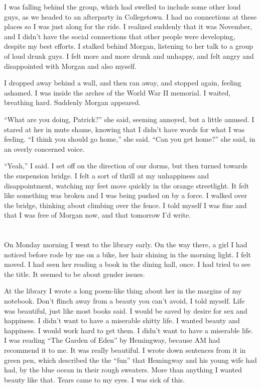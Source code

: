 I was falling behind the group, which had swelled to include some other loud
guys, as we headed to an afterparty in Collegetown.  I had no connections at
these places so I was just along for the ride.  I realized suddenly that it was
November, and I didn't have the social connections that other people were
developing, despite my best efforts.  I stalked behind Morgan, listening to her
talk to a group of loud drunk guys.  I felt more and more drunk and unhappy, and
felt angry and disappointed with Morgan and also myself.

I dropped away behind a wall, and then ran away, and stopped again, feeling
ashamed.   I was inside the arches of the World War II memorial.  I waited,
breathing hard.  Suddenly Morgan appeared.  

``What are you doing, Patrick?'' she said, seeming annoyed, but a little amused.
I stared at her in mute shame, knowing that I didn't have words for what I was
feeling.  ``I think you should go home,'' she said.  ``Can you get home?'' she
said, in an overly concerned voice.

``Yeah,'' I said.  I set off on the direction of our dorms, but then turned
towards the suspension bridge.  I felt a sort of thrill at my unhappiness and
disappointment, watching my feet move quickly in the orange streetlight.  It
felt like something was broken and I was being pushed on by a force.  I walked
over the bridge, thinking about climbing over the fence.  I told myself I was
fine and that I was free of Morgan now, and that tomorrow I'd write.

\section{}

On Monday morning I went to the library early.  On the way there, a girl I had
noticed before rode by me on a bike, her hair shining in the morning light.  I
felt moved.  I had seen her reading a book in the dining hall, once.  I had
tried to see the title.  It seemed to be about gender issues.

At the library I wrote a long poem-like thing about her in the margins of my
notebook.  Don't flinch away from a beauty you can't avoid, I told myself.  Life
was beautiful, just like most books said.  I would be saved by desire for sex and
happiness.  I didn't want to have a miserable shitty life.  I wanted beauty and
happiness.  I would work hard to get them.  I didn't want to have a miserable
life.  I was reading ``The Garden of Eden'' by Hemingway, because AM had recommend it to
me.  It was really beautiful.  I wrote down sentences from it in green pen,
which described the the ``fun'' that Hemingway and his young wife had had, by
the blue ocean in their rough sweaters.  More than anything I wanted beauty like
that.  Tears came to my eyes.  I was sick of this.

